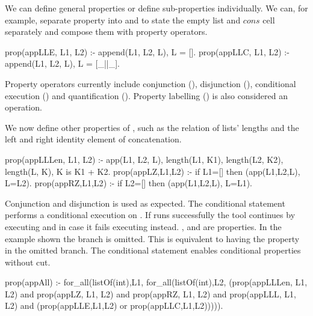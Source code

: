 We can define general properties or define sub-properties individually. 
%
We can, for example, separate property  into
 and  to state the empty list and $cons$
cell separately and compose them with property operators.
%
\begin{yapcode}
 prop({appLLE, L1, L2}) :- append(L1, L2, L), L = [].
 prop({appLLC, L1, L2}) :- append(L1, L2, L), L = [_||_].
\end{yapcode}


Property operators currently  include conjunction
 (), disjunction (), conditional
execution () and quantification
().
%
Property labelling () is also considered an operation.
%




We now define other properties of , such as the relation
of lists' lengths and the left and right identity element of
concatenation.
%
\begin{yapcode}
 prop({appLLLen, L1, L2}) :- app(L1, L2, L),
   length(L1, K1), length(L2, K2), length(L, K), K is K1 + K2.
 prop({appLZ,L1,L2}) :- if L1=[] then (app(L1,L2,L), L=L2).
 prop({appRZ,L1,L2}) :- if L2=[] then (app(L1,L2,L), L=L1).
\end{yapcode}
%
Conjunction and disjunction is used as expected.
%
The conditional statement  performs a
conditional execution on . 
%
If  runs successfully the tool continues by executing  and in case it
fails executing  instead.
%
,  and  are \plqc{} properties.
%
In the example shown the  branch is omitted.
%
This is equivalent to having the property  in the omitted branch.
%
The conditional statement enables conditional properties without cut. %
%
\begin{yapcode}
 prop(appAll) :- for_all(listOf(int),L1, for_all(listOf(int),L2,
   (prop({appLLLen, L1, L2}) and prop({appLZ, L1, L2})
   and prop({appRZ, L1, L2}) and prop({appLLL, L1, L2})
   and (prop({appLLE,L1,L2}) or prop({appLLC,L1,L2}))))).
\end{yapcode}



